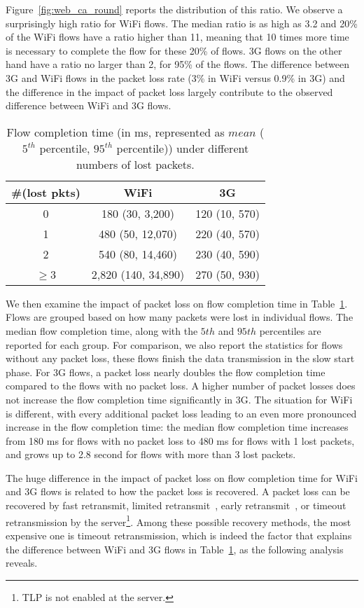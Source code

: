 Figure~\ref{fig:web_ca_round} reports the distribution of this ratio. We observe a surprisingly high ratio for WiFi flows. The median ratio is as high as 3.2 and 20\% of the WiFi flows have a ratio higher than 11, meaning that 10 times more time is necessary to complete the flow for these 20\% of flows. 3G flows on the other hand have a ratio no larger than 2, for 95\% of the flows. The difference between 3G and WiFi flows in the packet loss rate (3\% in WiFi versus 0.9\% in 3G) and the difference in the impact of packet loss largely contribute to the observed difference between WiFi and 3G flows.

\begin{table}[th]
\caption{Flow completion time (in ms, represented as $mean$ ($5^{th}$ percentile, $95^{th}$ percentile)) under different numbers of lost packets.}
\label{tab:web_loss_finish_time}
\centering
\renewcommand{\arraystretch}{1.0}
\begin{tabular}{c|c|c}
\hline
\#(lost pkts) & WiFi & 3G\\
\hline
0 & 180 (30, 3,200) & 120 (10, 570) \\
%
1 & 480 (50, 12,070) & 220 (40, 570) \\
%
2 & 540 (80, 14,460) & 230 (40, 590) \\
%
$\ge$3 & 2,820 (140, 34,890) & 270 (50, 930) \\
\hline
\end{tabular}
\end{table}

We then examine the impact of packet loss on flow completion time in Table~\ref{tab:web_loss_finish_time}. Flows are grouped based on how many packets were lost in individual flows. The median flow completion time, along with the $5th$ and $95th$ percentiles are reported for each group. For comparison, we also report the statistics for flows without any packet loss, \ie these flows finish the data transmission in the slow start phase. For 3G flows, a packet loss nearly doubles the flow completion time compared to the flows with no packet loss. A higher number of packet losses does not increase the flow completion time significantly in 3G. The situation for WiFi is different, with every additional packet loss leading to an even more pronounced increase in the flow completion time: the median flow completion time increases from 180 ms for flows with no packet loss to 480 ms for flows with 1 lost packets, and grows up to 2.8 second for flows with more than 3 lost packets. 

The huge difference in the impact of packet loss on flow completion time for WiFi and 3G flows is related to how the packet loss is recovered. A packet loss can be recovered by fast retransmit, limited retransmit~\cite{allman2001enhancing}, early retransmit~\cite{rfc5827}, or timeout retransmission by the server\footnote{TLP \cite{flach2013reducing} is not enabled at the server.}. Among these possible recovery methods, the most expensive one is timeout retransmission, which is indeed the factor that explains the difference between WiFi and 3G flows in Table~\ref{tab:web_loss_finish_time}, as the following analysis reveals.

